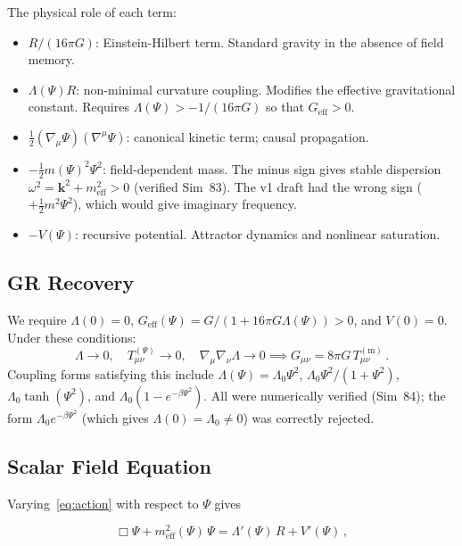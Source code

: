 \documentclass[12pt,a4paper]{article}
\begin{document}
The physical role of each term:
\begin{itemize}
  \item $R/(16\pi G)$: Einstein-Hilbert term. Standard gravity in the absence of field memory.
  \item $\Lambda(\Psi)R$: non-minimal curvature coupling. Modifies the effective gravitational constant. Requires $\Lambda(\Psi) > -1/(16\pi G)$ so that $G_{\mathrm{eff}} > 0$.
  \item $\tfrac{1}{2}(\nabla_\mu\Psi)(\nabla^\mu\Psi)$: canonical kinetic term; causal propagation.
  \item $-\tfrac{1}{2}m(\Psi)^2\Psi^2$: field-dependent mass. The minus sign gives stable dispersion $\omega^2 = \mathbf{k}^2 + m_{\mathrm{eff}}^2 > 0$ (verified Sim~83). The v1 draft had the wrong sign ($+\tfrac{1}{2}m^2\Psi^2$), which would give imaginary frequency.
  \item $-V(\Psi)$: recursive potential. Attractor dynamics and nonlinear saturation.
\end{itemize}

\subsection{GR Recovery}
\label{sec:GR_limit}

We require $\Lambda(0) = 0$, $G_{\mathrm{eff}}(\Psi) = G/(1 + 16\pi G\Lambda(\Psi)) > 0$,
and $V(0) = 0$. Under these conditions:
\begin{equation}
\Lambda \to 0,\quad T^{(\Psi)}_{\mu\nu} \to 0,\quad
\nabla_\mu\nabla_\nu\Lambda \to 0
\implies
G_{\mu\nu} = 8\pi G\,T^{(\mathrm{m})}_{\mu\nu}\,.
\end{equation}
Coupling forms satisfying this include $\Lambda(\Psi) = \Lambda_0\Psi^2$,
$\Lambda_0\Psi^2/(1+\Psi^2)$, $\Lambda_0\tanh(\Psi^2)$, and
$\Lambda_0(1-e^{-\beta\Psi^2})$. All were numerically verified (Sim~84);
the form $\Lambda_0 e^{-\beta\Psi^2}$ (which gives $\Lambda(0) = \Lambda_0 \neq 0$)
was correctly rejected.

\subsection{Scalar Field Equation}
\label{sec:scalar_eq}

Varying~\eqref{eq:action} with respect to $\Psi$ gives

\begin{equation}
\label{eq:scalar}
\Box\Psi + m_{\mathrm{eff}}^2(\Psi)\,\Psi
= \Lambda'(\Psi)\,R + V'(\Psi)\,,
\end{equation}
\end{document}
